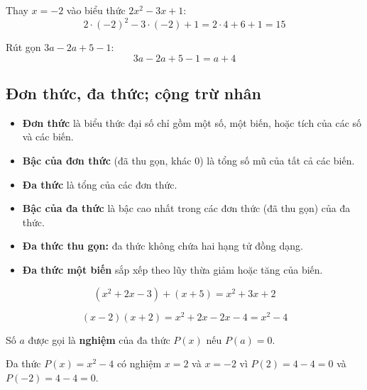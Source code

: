 \documentclass[12pt,a4paper]{article}
\begin{document}
\begin{vidu}[title={Thay số vào biểu thức}]
Thay $x = -2$ vào biểu thức $2x^2 - 3x + 1$:
\[
  2 \cdot (-2)^2 - 3 \cdot (-2) + 1 = 2 \cdot 4 + 6 + 1 = 15
\]
\end{vidu}

\begin{vidu}[title={Rút gọn biểu thức}]
Rút gọn $3a - 2a + 5 - 1$:
\[
  3a - 2a + 5 - 1 = a + 4
\]
\end{vidu}

\subsection{Đơn thức, đa thức; cộng trừ nhân}

\begin{dinhnghia}
\begin{itemize}
  \item \textbf{Đơn thức} là biểu thức đại số chỉ gồm một số, một biến, hoặc tích của các số và các biến.
  \item \textbf{Bậc của đơn thức} (đã thu gọn, khác $0$) là tổng số mũ của tất cả các biến.
  \item \textbf{Đa thức} là tổng của các đơn thức.
  \item \textbf{Bậc của đa thức} là bậc cao nhất trong các đơn thức (đã thu gọn) của đa thức.
  \item \textbf{Đa thức thu gọn:} đa thức không chứa hai hạng tử đồng dạng.
  \item \textbf{Đa thức một biến} sắp xếp theo lũy thừa giảm hoặc tăng của biến.
\end{itemize}
\end{dinhnghia}

\begin{vidu}[title={Cộng đa thức}]
\[
  (x^2 + 2x - 3) + (x + 5) = x^2 + 3x + 2
\]
\end{vidu}

\begin{vidu}[title={Nhân đa thức}]
\[
  (x - 2)(x + 2) = x^2 + 2x - 2x - 4 = x^2 - 4
\]
\end{vidu}

\begin{dinhnghia}[title={Nghiệm của đa thức một biến}]
Số $a$ được gọi là \textbf{nghiệm} của đa thức $P(x)$ nếu $P(a) = 0$.
\end{dinhnghia}

\begin{vidu}
Đa thức $P(x) = x^2 - 4$ có nghiệm $x = 2$ và $x = -2$ vì $P(2) = 4 - 4 = 0$ và $P(-2) = 4 - 4 = 0$.
\end{vidu}
\end{document}
